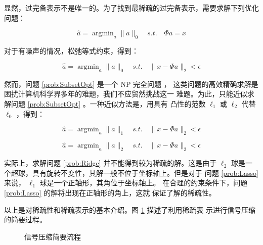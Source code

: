 显然，过完备表示不是唯一的。为了找到最稀疏的过完备表示，需要求解下列优化
问题：
\begin{problem}
\begin{equation}
\hat a = \mathop{\arg\min}_a \|a\|_0 \quad s.t. \quad \Phi a = x
\end{equation}
\end{problem}
对于有噪声的情况，松弛等式约束，得到：
\begin{problem}[子集最优化问题] \label{prob:SubsetOpt}
\begin{equation}
\hat a = \mathop{\arg\min}_a  \|a\|_0 \quad s.t. \quad \|x - \Phi a\|_2 < \epsilon
\end{equation}
\end{problem}
然而，问题 \ref{prob:SubsetOpt} 是一个 NP 完全问题 \cite{SubsetOptNPC}，
这类问题的高效精确求解是困扰计算机科学界多年的难题，我们不应贸然挑战这一
难题。为此，只能近似求解问题 \ref{prob:SubsetOpt} 。一种近似方法是，用具有
凸性的范数 $\ell_1$ 或 $\ell_2$ 代替 $\ell_0$ ，得到：
\begin{problem} \label{prob:Lasso}
\begin{equation} \label{eqn:Lasso}
\hat a = \mathop{\arg\min}_a \|a\|_1 \quad s.t. \quad \|x - \Phi a\|_2 < \epsilon
\end{equation}
\end{problem}
\begin{problem}[岭回归问题] \label{prob:Ridge}
\begin{equation}
\hat a = \mathop{\arg\min}_a \|a\|_2 \quad s.t. \quad \|x - \Phi a\|_2 < \epsilon
\end{equation}
\end{problem}
实际上，求解问题 \ref{prob:Ridge} 并不能得到较为稀疏的解。这是由于
$\ell_2$ 球是一个超球，具有旋转不变性，其解一般不位于坐标轴上。但是对于
问题 \ref{prob:Lasso} 来说， $\ell_1$ 球是一个正轴形，其角位于坐标轴上。
在合理的约束条件下，问题 \ref{prob:Lasso} 的解将出现在正轴形的角上，这就
保证了解的稀疏性。

以上是对稀疏性和稀疏表示的基本介绍。图 \ref{Fig:Compress} 描述了利用稀疏表
示进行信号压缩的简要过程。

\begin{figure}
\centering
{} %

\caption{信号压缩简要流程}
\label{Fig:Compress}
\end{figure}

